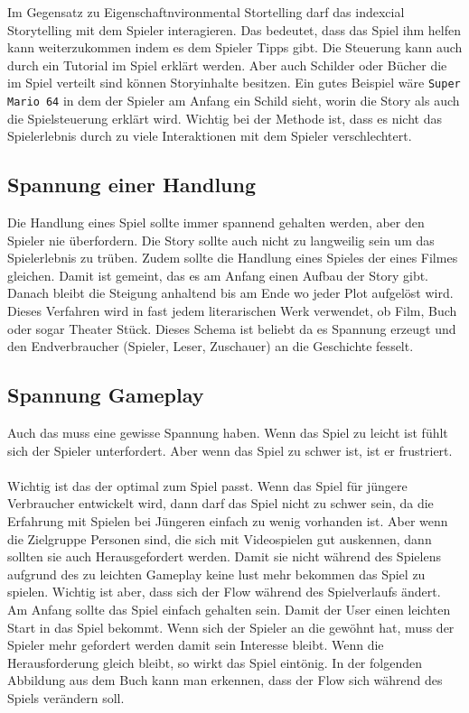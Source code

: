 Im Gegensatz zu Eigenschaftnvironmental Stortelling darf das indexcial Storytelling mit dem Spieler interagieren. Das bedeutet, dass das Spiel ihm helfen kann weiterzukommen indem es dem Spieler Tipps gibt. Die Steuerung kann auch durch ein Tutorial im Spiel erklärt werden. Aber auch Schilder oder Bücher die im Spiel verteilt sind können Storyinhalte besitzen. Ein gutes Beispiel wäre \verb+Super Mario 64+ in dem der Spieler am Anfang ein Schild sieht, worin die Story als auch die Spielsteuerung erklärt wird. Wichtig bei der Methode ist, dass es nicht das Spielerlebnis durch zu viele Interaktionen mit dem Spieler verschlechtert. 

\subsection{Spannung einer Handlung}
Die Handlung eines Spiel sollte immer spannend gehalten werden, aber den Spieler nie überfordern. Die Story sollte auch nicht zu langweilig sein um das Spielerlebnis zu trüben. Zudem sollte die Handlung eines Spieles der eines Filmes gleichen. Damit ist gemeint, das es am Anfang einen Aufbau der Story gibt. Danach bleibt die Steigung anhaltend bis am Ende wo jeder Plot aufgelöst wird. Dieses Verfahren wird in fast jedem literarischen Werk verwendet, ob Film, Buch oder sogar Theater Stück. Dieses Schema ist beliebt da es Spannung erzeugt und den Endverbraucher (Spieler, Leser, Zuschauer) an die Geschichte fesselt.

\subsection{Spannung Gameplay}
Auch das  muss eine gewisse Spannung haben. Wenn das Spiel zu leicht ist fühlt sich der Spieler unterfordert. Aber wenn das Spiel zu schwer ist, ist er frustriert.\\\\
Wichtig ist das der  optimal zum Spiel passt. Wenn das Spiel für jüngere Verbraucher entwickelt wird, dann darf das Spiel nicht zu schwer sein, da die Erfahrung mit Spielen bei Jüngeren einfach zu wenig vorhanden ist. Aber wenn die Zielgruppe Personen sind, die sich mit Videospielen gut auskennen, dann sollten sie auch Herausgefordert werden. Damit sie nicht während des Spielens aufgrund des zu leichten Gameplay keine lust mehr bekommen das Spiel zu spielen. Wichtig ist aber, dass sich der Flow während des Spielverlaufs ändert. Am Anfang sollte das Spiel einfach gehalten sein. Damit der User einen leichten Start in das Spiel bekommt. Wenn sich der Spieler an die  gewöhnt hat, muss der Spieler mehr gefordert werden damit sein Interesse bleibt. Wenn die Herausforderung gleich bleibt, so wirkt das Spiel eintönig. In der folgenden Abbildung aus dem Buch  kann man erkennen, dass der Flow sich während des Spiels verändern soll.


